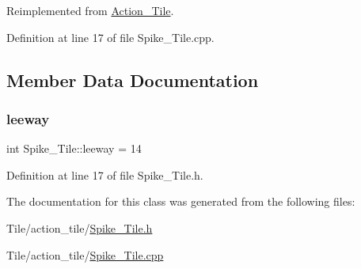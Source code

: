 Reimplemented from \hyperlink{class_action___tile_aa366fba2ea9d3947c28c45f939ee0217}{Action\+\_\+\+Tile}.



Definition at line 17 of file Spike\+\_\+\+Tile.\+cpp.



\subsection{Member Data Documentation}
\hypertarget{class_spike___tile_af294383b8e83dfd6cfbc72b73174f8df}{}\label{class_spike___tile_af294383b8e83dfd6cfbc72b73174f8df} 
\subsubsection{\texorpdfstring{leeway}{leeway}}
{\footnotesize\ttfamily int Spike\+\_\+\+Tile\+::leeway = 14}



Definition at line 17 of file Spike\+\_\+\+Tile.\+h.



The documentation for this class was generated from the following files\+:\begin{DoxyCompactItemize}
\item 
Tile/action\+\_\+tile/\hyperlink{_spike___tile_8h}{Spike\+\_\+\+Tile.\+h}\item 
Tile/action\+\_\+tile/\hyperlink{_spike___tile_8cpp}{Spike\+\_\+\+Tile.\+cpp}\end{DoxyCompactItemize}
